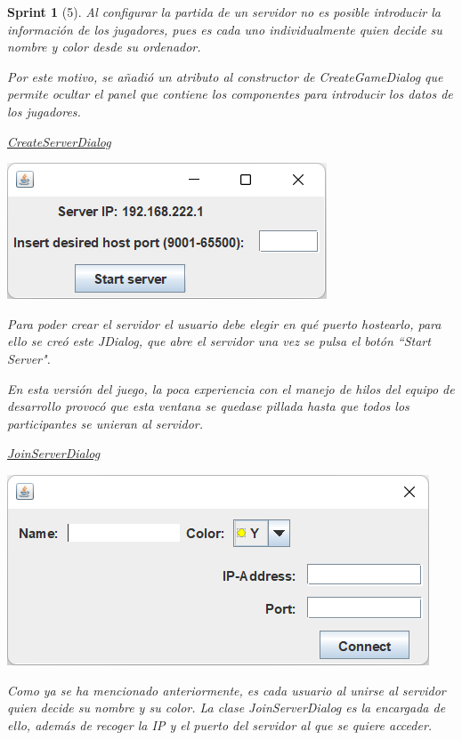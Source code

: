 \documentclass{article}
\theoremstyle{break}
\newtheorem*{sprint}{Sprint}
\begin{document}
\begin{sprint}[5]
Al configurar la partida de un servidor no es posible introducir la información de los jugadores, pues es cada uno individualmente quien decide su nombre y color desde su ordenador.

Por este motivo, se añadió un atributo al constructor de \textit{CreateGameDialog} que permite ocultar el panel que contiene los componentes para introducir los datos de los jugadores.

\underline{CreateServerDialog}
\begin{center}
\includegraphics[scale=0.8]{create-server-sprint5.png}
\end{center}

Para poder crear el servidor el usuario debe elegir en qué puerto hostearlo, para ello se creó este \textit{JDialog}, que abre el servidor una vez se pulsa el botón ``Start Server".

En esta versión del juego, la poca experiencia con el manejo de hilos del equipo de desarrollo provocó que esta ventana se quedase pillada hasta que todos los participantes se unieran al servidor.

\underline{JoinServerDialog}
\begin{center}
\includegraphics[scale=0.8]{join-server-sprint5.png}
\end{center}

Como ya se ha mencionado anteriormente, es cada usuario al unirse al servidor quien decide su nombre y su color. La clase \textit{JoinServerDialog} es la encargada de ello, además de recoger la IP y el puerto del servidor al que se quiere acceder.


\end{sprint}
\end{document}
